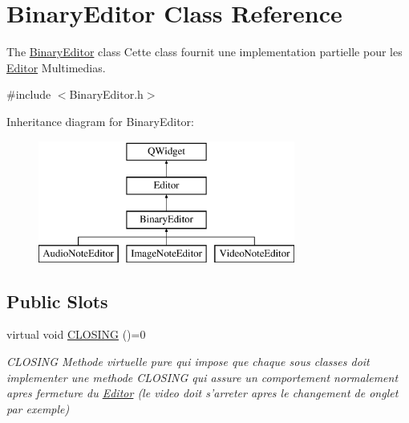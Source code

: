 \hypertarget{class_binary_editor}{\section{Binary\-Editor Class Reference}
\label{class_binary_editor}
}


The \hyperlink{class_binary_editor}{Binary\-Editor} class Cette class fournit une implementation partielle pour les \hyperlink{class_editor}{Editor} Multimedias.  




{\ttfamily \#include $<$Binary\-Editor.\-h$>$}

Inheritance diagram for Binary\-Editor\-:\begin{figure}[H]
\begin{center}
\leavevmode
\includegraphics[height=4.000000cm]{class_binary_editor}
\end{center}
\end{figure}
\subsection*{Public Slots}
\begin{DoxyCompactItemize}
\item 
virtual void \hyperlink{class_binary_editor_adac428adbb6e6743d60d07767137e65e}{C\-L\-O\-S\-I\-N\-G} ()=0
\begin{DoxyCompactList}\small\item\em C\-L\-O\-S\-I\-N\-G Methode virtuelle pure qui impose que chaque sous classes doit implementer une methode C\-L\-O\-S\-I\-N\-G qui assure un comportement normalement apres fermeture du \hyperlink{class_editor}{Editor} (le video doit s'arreter apres le changement de onglet par exemple) \end{DoxyCompactList}\end{DoxyCompactItemize}
